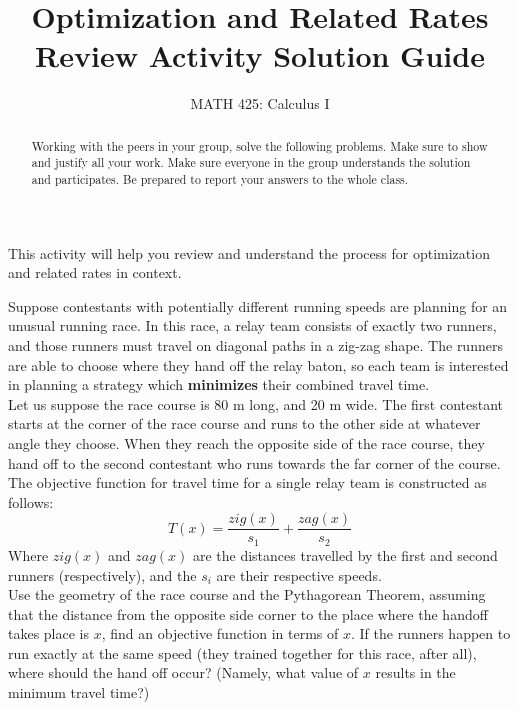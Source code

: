 \documentclass{ximera}
\title{Optimization and Related Rates Review Activity Solution Guide}
\author{MATH 425: Calculus I}
\begin{document}
\begin{abstract}
   Working with the peers in your group, solve the following problems. Make sure to show and justify all your work. Make sure everyone in the group understands the solution and participates. Be prepared to report your answers to the whole class. 
\end{abstract}
\maketitle

This activity will help you review and understand the process for optimization and related rates in context.

\begin{exercise}
Suppose contestants with potentially different running speeds are planning for an unusual running race.  In this race, a relay team consists of exactly two runners, and those runners must travel on diagonal paths in a zig-zag shape.  The runners are able to choose where they hand off the relay baton, so each team is interested in planning a strategy which \textbf{minimizes} their combined travel time. \\
Let us suppose the race course is 80 m long, and 20 m wide. The first contestant starts at the corner of the race course and runs to the other side at whatever angle they choose.  When they reach the opposite side of the race course, they hand off to the second contestant who runs towards the far corner of the course.\\
The objective function for travel time for a single relay team is constructed as follows: $$T(x)=\frac{zig(x)}{s_1}+\frac{zag(x)}{s_2}$$
Where $zig(x)$ and $zag(x)$ are the distances travelled by the first and second runners (respectively), and the $s_i$ are their respective speeds.\\
Use the geometry of the race course and the Pythagorean Theorem, assuming that the distance from the opposite side corner to the place where the handoff takes place is $x$, find an objective function in terms of $x$.  If the runners happen to run exactly at the same speed (they trained together for this race, after all), where should the hand off occur? (Namely, what value of $x$ results in the minimum travel time?)


\end{exercise}
\end{document}
